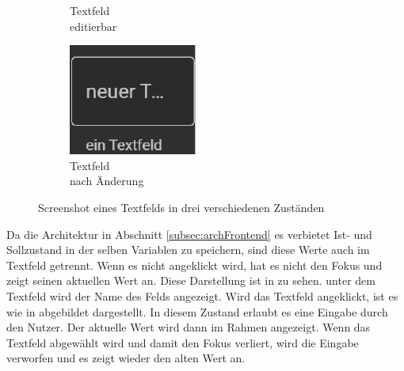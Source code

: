 \begin{figure}[ht]
\begin{subfigure}[h]{0.24\textwidth}
    \caption{Textfeld \\editierbar}
    \label{fig:frontend:poc:textFeld:focus}
  \end{subfigure}
  \hfill
  \begin{subfigure}[h]{0.24\textwidth}
    \centering
    \includegraphics[width=\textwidth]{content/hauptteil/umsetzungPoC/frontend/res/TextfeldNeuerText.pdf}
    \caption{Textfeld \\nach Änderung}
    \label{fig:frontend:poc:textFeld:nachAenderung}
  \end{subfigure}
  \hspace{0.05\textwidth}
  \caption[Screenshot, Zustände eines Textfelds]{Screenshot eines Textfelds in drei verschiedenen Zuständen}
  \label{fig:frontend:poc:textFeld}
\end{figure}
Da die Architektur in Abschnitt \ref{subsec:archFrontend} es verbietet Ist- und Sollzustand in der selben Variablen zu speichern, sind diese Werte auch im Textfeld getrennt.
Wenn es nicht angeklickt wird, hat es nicht den Fokus und zeigt seinen aktuellen Wert an. 
Diese Darstellung ist in  zu sehen. unter dem Textfeld wird der Name des Felds angezeigt.
Wird das Textfeld angeklickt, ist es wie in  abgebildet dargestellt. In diesem Zustand erlaubt es eine Eingabe durch den Nutzer.
Der aktuelle Wert wird dann im Rahmen angezeigt. 
Wenn das Textfeld abgewählt wird und damit den Fokus verliert, wird die Eingabe verworfen und es zeigt wieder den alten Wert an.
